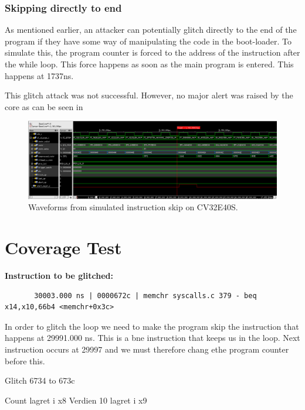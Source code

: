 \subsubsection{Skipping directly to end}

As mentioned earlier, an attacker can potentially glitch directly to the end of the program if they have some way of manipulating the code in the boot-loader. To simulate this, the program counter is forced to the address of the instruction after the while loop. This force happens as soon as the main program is entered. This happens at 1737ns. 

This glitch attack was not successful. However, no major alert was raised by the core as can be seen in 

\begin{figure}[h!]
    \centering
    \includegraphics[width=\textwidth]{docs/images/instr_skip_glitch_injection_single_core.png}
    \caption{Waveforms from simulated instruction skip on CV32E40S.}
    \label{fig:direct_skip_single_wave}
\end{figure}



\section{Coverage Test}
\label{sec:cov_test_result}



\textbf{Instruction to be glitched:}
\begin{lstlisting}
       30003.000 ns | 0000672c | memchr syscalls.c 379 - beq x14,x10,66b4 <memchr+0x3c>
\end{lstlisting}

In order to glitch the loop we need to make the program skip the instruction that happens at 29991.000 ns. This is a bne instruction that keeps us in the loop. Next instruction occurs at 29997 and we must therefore chang ethe program counter before this. 

Glitch 6734 to 673c

Count lagret i x8 
Verdien 10 lagret i x9

